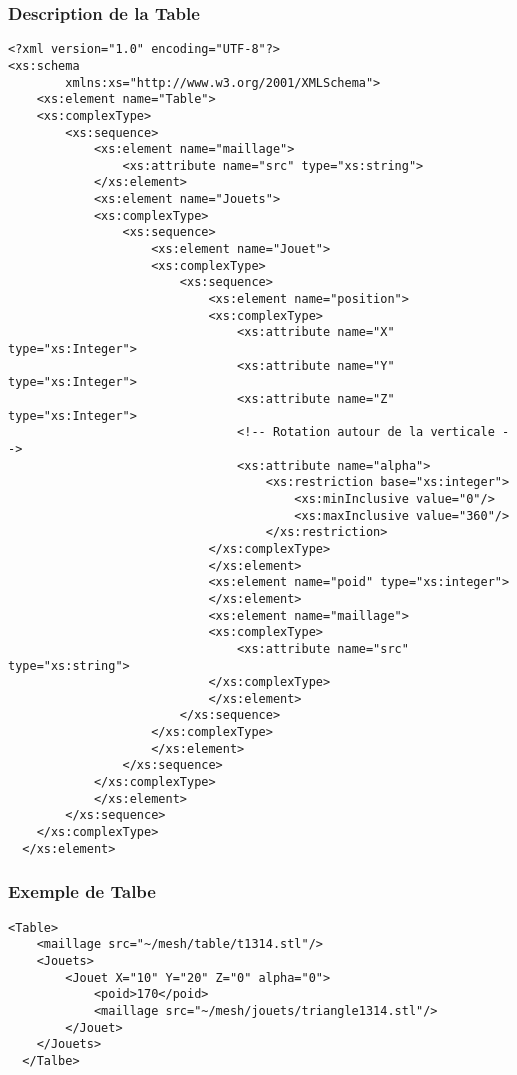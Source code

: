 \subsubsection{Description de la Table}
 \begin{lstlisting}[caption=Description de la Table, label=desctable]
<?xml version="1.0" encoding="UTF-8"?>
<xs:schema
        xmlns:xs="http://www.w3.org/2001/XMLSchema">
    <xs:element name="Table">
    <xs:complexType>
        <xs:sequence>
            <xs:element name="maillage">
                <xs:attribute name="src" type="xs:string">
            </xs:element>
            <xs:element name="Jouets">
            <xs:complexType>
                <xs:sequence>
                    <xs:element name="Jouet">
                    <xs:complexType>
                        <xs:sequence>
                            <xs:element name="position">
                            <xs:complexType>
                                <xs:attribute name="X" type="xs:Integer">
                                <xs:attribute name="Y" type="xs:Integer">
                                <xs:attribute name="Z" type="xs:Integer"> 
                                <!-- Rotation autour de la verticale -->
                                <xs:attribute name="alpha">
                                    <xs:restriction base="xs:integer">
                                        <xs:minInclusive value="0"/>
                                        <xs:maxInclusive value="360"/>
                                    </xs:restriction> 
                            </xs:complexType>
                            </xs:element>
                            <xs:element name="poid" type="xs:integer">
                            </xs:element>
                            <xs:element name="maillage">
                            <xs:complexType>
                                <xs:attribute name="src" type="xs:string">
                            </xs:complexType>
                            </xs:element>
                        </xs:sequence>
                    </xs:complexType>
                    </xs:element>
                </xs:sequence>
            </xs:complexType>
            </xs:element>
        </xs:sequence>
    </xs:complexType>
  </xs:element>
  \end{lstlisting}
  
\subsubsection{Exemple de Talbe}
  \begin{lstlisting}[caption=Description de la Table, label=desctable]
  <Table>
	<maillage src="~/mesh/table/t1314.stl"/>
	<Jouets>
		<Jouet X="10" Y="20" Z="0" alpha="0">
			<poid>170</poid>
			<maillage src="~/mesh/jouets/triangle1314.stl"/>
		</Jouet>
	</Jouets>
  </Talbe>
  \end{lstlisting}

